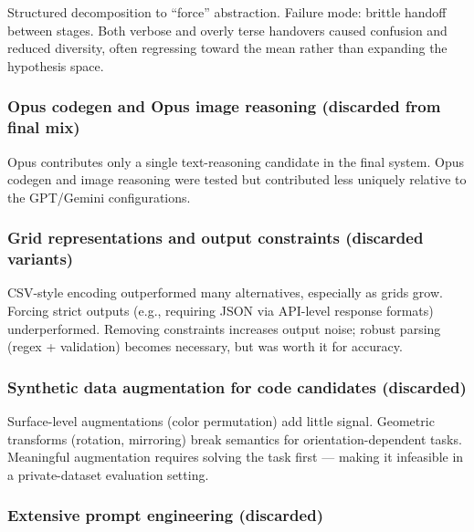 \documentclass[10pt]{article}
\begin{document}
Structured decomposition to ``force'' abstraction. Failure mode: brittle
handoff between stages. Both verbose and overly terse handovers caused
confusion and reduced diversity, often regressing toward the mean rather
than expanding the hypothesis space.

\hypertarget{opus-codegen-and-opus-image-reasoning-discarded-from-final-mix}{%
\subsubsection{Opus codegen and Opus image reasoning (discarded from
final
mix)}\label{opus-codegen-and-opus-image-reasoning-discarded-from-final-mix}}

Opus contributes only a single text-reasoning candidate in the final
system. Opus codegen and image reasoning were tested but contributed
less uniquely relative to the GPT/Gemini configurations.

\hypertarget{grid-representations-and-output-constraints-discarded-variants}{%
\subsubsection{Grid representations and output constraints (discarded
variants)}\label{grid-representations-and-output-constraints-discarded-variants}}

CSV-style encoding outperformed many alternatives, especially as grids
grow. Forcing strict outputs (e.g., requiring JSON via API-level
response formats) underperformed. Removing constraints increases output
noise; robust parsing (regex + validation) becomes necessary, but was
worth it for accuracy.

\hypertarget{synthetic-data-augmentation-for-code-candidates-discarded}{%
\subsubsection{Synthetic data augmentation for code candidates
(discarded)}\label{synthetic-data-augmentation-for-code-candidates-discarded}}

Surface-level augmentations (color permutation) add little signal.
Geometric transforms (rotation, mirroring) break semantics for
orientation-dependent tasks. Meaningful augmentation requires solving
the task first --- making it infeasible in a private-dataset evaluation
setting.

\hypertarget{extensive-prompt-engineering-discarded}{%
\subsubsection{Extensive prompt engineering
(discarded)}\label{extensive-prompt-engineering-discarded}}
\end{document}
